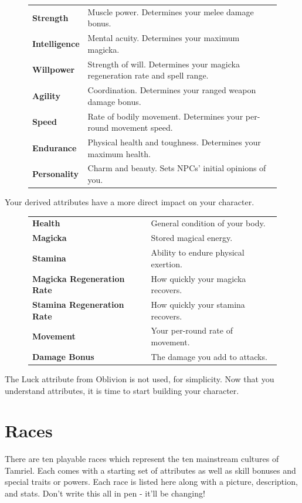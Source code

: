\documentclass[12pt]{book}
\begin{document}
\begin{figure}[h]
\begin{tabular}[h]{p{}p{}}
	\textbf{Strength} & Muscle power. Determines your melee damage bonus.\\
	\textbf{Intelligence} & Mental acuity. Determines your maximum magicka.\\
	\textbf{Willpower} & Strength of will. Determines your magicka regeneration rate and spell range.\\
	\textbf{Agility} & Coordination. Determines your ranged weapon damage bonus.\\
	\textbf{Speed} & Rate of bodily movement. Determines your per-round movement speed.\\
	\textbf{Endurance} & Physical health and toughness. Determines your maximum health.\\
	\textbf{Personality} & Charm and beauty. Sets NPCs' initial opinions of you.\\
\end{tabular}
\end{figure}

Your derived attributes have a more direct impact on your character.
\begin{figure}[h]
\begin{tabular}[h]{p{}p{}}
	\textbf{Health} & General condition of your body.\\
	\textbf{Magicka} & Stored magical energy.\\
	\textbf{Stamina} & Ability to endure physical exertion.\\
	\textbf{Magicka Regeneration Rate} & How quickly your magicka recovers.\\
	\textbf{Stamina Regeneration Rate} & How quickly your stamina recovers.\\
	\textbf{Movement} & Your per-round rate of movement.\\
	\textbf{Damage Bonus} & The damage you add to attacks.\\
\end{tabular}
\end{figure}

The Luck attribute from Oblivion is not used, for simplicity. Now that you understand attributes, it is time to start building your character.

\section{Races}
There are ten playable races which represent the ten mainstream cultures of Tamriel. Each comes with a starting set of attributes as well as skill bonuses and special traits or powers. Each race is listed here along with a picture, description, and stats. Don't write this all in pen - it'll be changing!\\
\end{document}
